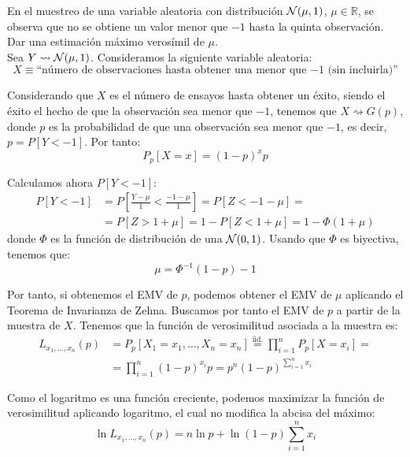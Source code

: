 \begin{ejercicio}
    En el muestreo de una variable aleatoria con distribución $\mathcal{N}(\mu,1)$, $\mu \in \mathbb{R}$, se observa que no se obtiene un valor menor que $-1$ hasta la quinta observación. Dar una estimación máximo verosímil de $\mu$.\\

    \noindent
    Sea $Y\rightsquigarrow\mathcal{N}(\mu, 1)$. Consideramos la siguiente variable aleatoria:
    \begin{equation*}
        X\equiv \text{``número de observaciones hasta obtener una menor que $-1$ (sin incluirla)''}
    \end{equation*}

    Considerando que $X$ es el número de ensayos hasta obtener un éxito, siendo el éxito el hecho de que la observación sea menor que $-1$, tenemos que $X\rightsquigarrow G(p)$, donde $p$ es la probabilidad de que una observación sea menor que $-1$, es decir, $p = P[Y<-1]$. Por tanto:
    \begin{equation*}
        P_p[X=x] = {(1-p)}^{x}p
    \end{equation*}

    Calculamos ahora $P[Y<-1]$:
    \begin{align*}
        P[Y<-1] &= P\left[\frac{Y-\mu}{1}<\frac{-1-\mu}{1}\right] = P[Z<-1-\mu]
        =\\&= P[Z>1+\mu] = 1-P[Z<1+\mu] = 1-\Phi(1+\mu)
    \end{align*}
    donde $\Phi$ es la función de distribución de una $\mathcal{N}(0,1)$. Usando que $\Phi$ es biyectiva, tenemos que:
    \begin{equation*}
        \mu = \Phi^{-1}\left(1-p\right) - 1
    \end{equation*}

    Por tanto, si obtenemos el EMV de $p$, podemos obtener el EMV de $\mu$ aplicando el Teorema de Invarianza de Zehna. Buscamos por tanto el EMV de $p$ a partir de la muestra de $X$. Tenemos que la función de verosimilitud asociada a la muestra es:
    \begin{align*}
        L_{x_1,\ldots,x_n}(p) &= P_p[X_1=x_1, \ldots, X_n=x_n] \stackrel{\text{iid.}}{=}\prod_{i=1}^{n} P_p[X=x_i]
        =\\&= \prod_{i=1}^{n} {(1-p)}^{x_i}p = p^n{(1-p)}^{\sum\limits_{i=1}^{n}x_i}
    \end{align*}

    Como el logaritmo es una función creciente, podemos maximizar la función de verosimilitud aplicando logaritmo, el cual no modifica la abcisa del máximo:
    \begin{equation*}
        \ln L_{x_1,\ldots,x_n}(p) = n\ln p + \ln(1-p)\sum_{i=1}^{n}x_i
    \end{equation*}


\end{ejercicio}
